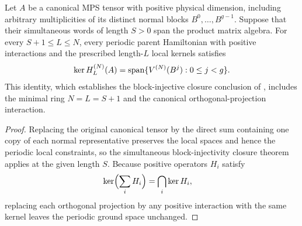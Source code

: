 \begin{lemma}
    \label{thm:ph_canonical_block_closure}
    \leanok
    Let $A$ be a canonical MPS tensor with positive physical dimension,
    including arbitrary multiplicities of its distinct normal blocks
    $B^0,\ldots,B^{g-1}$. Suppose that their simultaneous words of length
    $S>0$ span the product matrix algebra. For every $S+1\leq L\leq N$,
    every periodic parent Hamiltonian with positive interactions and the
    prescribed length-$L$ local kernels satisfies
    \begin{align}
        \ker H_L^{(N)}(A)=\operatorname{span}\{V^{(N)}(B^j):0\leq j<g\}.
        \notag
    \end{align}
    This identity, which establishes the block-injective closure conclusion of
    \cite[Section~IV.C]{Cirac2021Matrix}, includes the minimal ring $N=L=S+1$
    and the canonical orthogonal-projection interaction.
\end{lemma}
\begin{proof}
    \leanok
    Replacing the original canonical tensor by the direct sum containing
    one copy of each normal representative preserves the local spaces and hence
    the periodic local constraints, so the simultaneous
    block-injectivity closure theorem applies at the given length $S$.
    Because positive operators $H_i$ satisfy
    \begin{align}
        \ker\Bigl(\sum_i H_i\Bigr) & =\bigcap_i\ker H_i,
        \notag
    \end{align}
    replacing each orthogonal projection by any positive interaction with
    the same kernel leaves the periodic ground space unchanged.
\end{proof}
